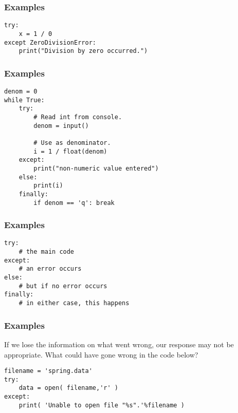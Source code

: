\documentclass[11pt]{beamer}
\begin{document}
\begin{frame}[fragile]
  \frametitle{Examples}
  \Enlarge

  \begin{Verbatim}
try:
    x = 1 / 0
except ZeroDivisionError:
    print("Division by zero occurred.")
  \end{Verbatim}
\end{frame}

\begin{frame}[fragile]
  \frametitle{Examples}
  \Enlarge

  \begin{Verbatim}
denom = 0
while True:
    try:
        # Read int from console.
        denom = input()

        # Use as denominator.
        i = 1 / float(denom)
    except:
        print("non-numeric value entered")
    else:
        print(i)
    finally:
        if denom == 'q': break
  \end{Verbatim}
\end{frame}

\begin{frame}[fragile]
  \frametitle{Examples}
  \Enlarge

  \begin{Verbatim}
try:
    # the main code
except:
    # an error occurs
else:
    # but if no error occurs
finally:
    # in either case, this happens
  \end{Verbatim}
\end{frame}

\begin{frame}[fragile]
  \frametitle{Examples}
  \Enlarge

  \begin{enumerate}
  \myitem  If we lose the information on what went wrong, our response may not be appropriate. \pause
  \myitem  What could have gone wrong in the code below?
  \end{enumerate}

  \begin{Verbatim}
filename = 'spring.data'
try:
    data = open( filename,'r' )
except:
    print( 'Unable to open file "%s".'%filename )
  \end{Verbatim}
\end{frame}
\end{document}

